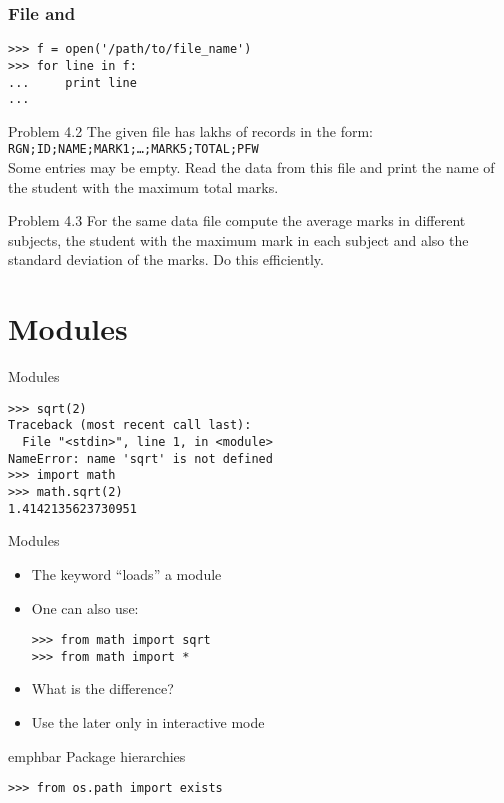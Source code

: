 \documentclass[14pt,compress]{beamer}
\newcommand{\emphbar}[1]
{\begin{beamercolorbox}[rounded=true]{emphbar} 
      {#1}
 \end{beamercolorbox}
}
\newcounter{time}
\newcommand{\inctime}[1]{\addtocounter{time}{#1}{\tiny \thetime\ m}}
\newcommand{\typ}[1]{\texttt{#1}}
\newcommand{\kwrd}[1]{ \texttt{\textbf{\color{blue}{#1}}}  }
\begin{document}
\begin{frame}[fragile]
    \frametitle{File and \kwrd{for}}
\begin{lstlisting}
>>> f = open('/path/to/file_name')
>>> for line in f:
...     print line
...
\end{lstlisting}
\end{frame}

\begin{frame}{Problem 4.2}
    The given file has lakhs of records in the form:\\
    \typ{RGN;ID;NAME;MARK1;\ldots;MARK5;TOTAL;PFW}\\
    Some entries may be empty.  Read the data from this file and print the
    name of the student with the maximum total marks.
\end{frame}

\begin{frame}{Problem 4.3}
    For the same data file compute the average marks in different
    subjects, the student with the maximum mark in each subject and also
    the standard deviation of the marks.  Do this efficiently.

    \inctime{30}
\end{frame}


\section{Modules}

\begin{frame}[fragile]
    {Modules}
\begin{lstlisting}
>>> sqrt(2)
Traceback (most recent call last):
  File "<stdin>", line 1, in <module>
NameError: name 'sqrt' is not defined
>>> import math        
>>> math.sqrt(2)
1.4142135623730951
\end{lstlisting}
\end{frame}

\begin{frame}[fragile]
    {Modules}
  \begin{itemize}
    \item The \kwrd{import} keyword ``loads'' a module
    \item One can also use:
      \begin{lstlisting}
>>> from math import sqrt
>>> from math import *
      \end{lstlisting}    
    \item What is the difference?
    \item \alert{Use the later only in interactive mode}
    \end{itemize}
  \emphbar{Package hierarchies}
      \begin{lstlisting}
>>> from os.path import exists
      \end{lstlisting}
\end{frame}
\end{document}
